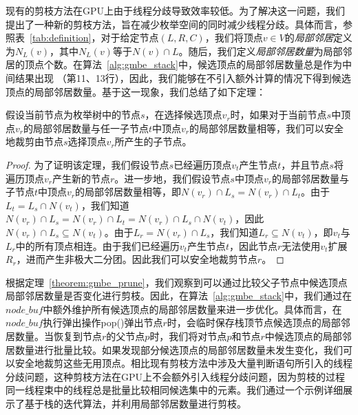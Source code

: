 现有的剪枝方法在GPU上由于线程分歧导致效率较低。为了解决这一问题，我们提出了一种新的剪枝方法，旨在减少枚举空间的同时减少线程分歧。具体而言，参照表~\ref{tab:definition}，对于给定节点$(L, R, C)$，我们将顶点$v \in V$的\emph{局部邻居}定义为$N_L(v)$，其中$N_L(v)$等于$N(v) \cap L$。随后，我们定义\emph{局部邻居数量}为局部邻居的顶点个数。在算法~\ref{alg:gmbe_stack}中，候选顶点的局部邻居数量总是作为中间结果出现 （第11、13行），因此，我们能够在不引入额外计算的情况下得到候选顶点的局部邻居数量。基于这一现象，我们总结了如下定理：

\begin{theorem}
  假设当前节点为枚举树中的节点$s$，在选择候选顶点$v_r$时，如果对于当前节点$s$中顶点$v_r$的局部邻居数量与任一子节点$t$中顶点$v_r$的局部邻居数量相等，我们可以安全地裁剪由节点$s$选择顶点$v_r$所产生的子节点。
  \label{theorem:gmbe_prune}
\end{theorem}

\begin{proof}
  为了证明该定理，我们假设节点$s$已经遍历顶点$v_t$产生节点$t$，并且节点$s$将遍历顶点$v_r$产生新的节点$r$。进一步地，我们假设节点$s$中顶点$v_r$的局部邻居数量与子节点$t$中顶点$v_r$的局部邻居数量相等，即$N(v_r) \cap L_s =N(v_r) \cap L_t$。由于$L_t = L_s\cap N(v_t)$，我们知道$N(v_r) \cap L_s =N(v_r) \cap L_t= N(v_r) \cap L_s\cap N(v_t)$，因此$N(v_r) \cap L_s \subseteq N(v_t)$。由于$L_r = N(v_r)\cap L_s$，我们知道$L_r\subseteq N(v_t)$，即$v_t$与$L_r$中的所有顶点相连。由于我们已经遍历$v_t$产生节点$t$，因此节点$r$无法使用$v_t$扩展$R_r$，进而产生非极大二分团。因此我们可以安全地裁剪节点$r$。

\end{proof}

根据定理~\ref{theorem:gmbe_prune}，我们观察到可以通过比较父子节点中候选顶点局部邻居数量是否变化进行剪枝。因此，在算法~\ref{alg:gmbe_stack}中，我们通过在$node\_buf$中额外维护所有候选顶点的局部邻居数量来进一步优化。具体而言，在$node\_buf$执行弹出操作\textsf{pop()}弹出节点$r$时，会临时保存栈顶节点候选顶点的局部邻居数量。当恢复到节点$r$的父节点$p$时，我们将对节点$p$和节点$r$中候选顶点的局部邻居数量进行批量比较。如果发现部分候选顶点的局部邻居数量未发生变化，我们可以安全地裁剪这些无用顶点。相比现有剪枝方法中涉及大量判断语句所引入的线程分歧问题，这种剪枝方法在GPU上不会额外引入线程分歧问题，因为剪枝的过程同一线程束中的线程总是批量比较相同候选集中的元素。我们通过一个示例详细展示了基于栈的迭代算法，并利用局部邻居数量进行剪枝。












